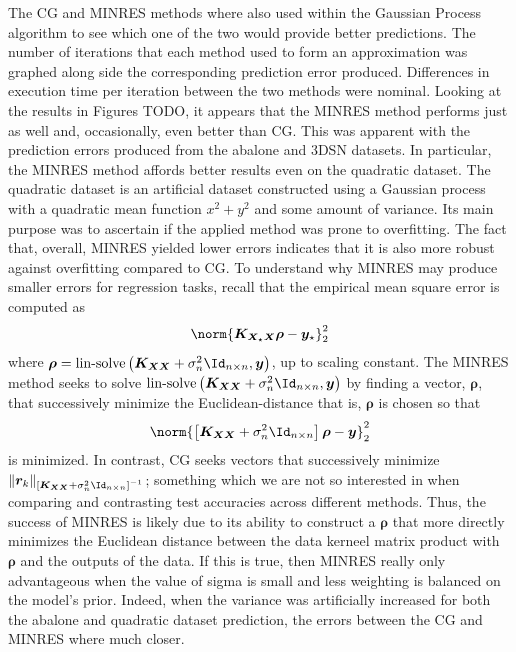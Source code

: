 The CG and MINRES methods where also used within the Gaussian Process algorithm to see which one of the two would provide better predictions. The number of iterations that each method used to form an approximation was graphed along side the corresponding prediction error produced. Differences in execution time per iteration between the two methods were nominal. Looking at the results in Figures TODO, it appears that the MINRES method performs just as well and, occasionally, even better than CG. This was apparent with the prediction errors produced from the abalone and 3DSN datasets. In particular, the MINRES method affords better results even on the quadratic dataset. The quadratic dataset is an artificial dataset constructed using a Gaussian process with a quadratic mean function $x^2 + y^2$ and some amount of variance. Its main purpose was to ascertain if the applied method was prone to overfitting. The fact that, overall, MINRES yielded lower errors indicates that it is also more robust against overfitting compared to CG. To understand why MINRES may produce smaller errors for regression tasks, recall that the empirical mean square error is computed as
\begin{align*}
    \norm{\bm{K_{X_{\star} X}} \bm{\rho} - \bm{y}_{\star}}_2^2
\end{align*}
where $\bm{\rho} = \operatorname{lin-solve} \left( \bm{K_{XX}} + \sigma_n^2 \Id_{n \times n} , \bm{y} \right)$, up to scaling constant. The MINRES method seeks to solve $\operatorname{lin-solve} \left( \bm{K_{XX}} + \sigma_n^2 \Id_{n \times n} , \bm{y} \right)$ by finding a vector, $\bm{\rho}$, that successively minimize the Euclidean-distance that is, $\bm{\rho}$ is chosen so that
\begin{equation*}
    \norm{\left[ \bm{K_{XX}} + \sigma_n^2 \Id_{n \times n} \right] \bm{\rho} - \bm{y}}_2^2
\end{equation*}
is minimized. In contrast, CG seeks vectors that successively minimize $\| \bm{r}_{k} \|_{\left[ \bm{K_{XX}} + \sigma_n^2 \Id_{n \times n} \right]^{-1}}$; something which we are not so interested in when comparing and contrasting test accuracies across different methods. Thus, the success of MINRES is likely due to its ability to construct a $\bm{\rho}$ that more directly minimizes the Euclidean distance between the data kerneel matrix product with $\bm{\rho}$ and the outputs of the data. If this is true, then MINRES really only advantageous when the value of sigma is small and less weighting is balanced on the model's prior. Indeed, when the variance was artificially increased for both the abalone and quadratic dataset prediction, the errors between the CG and MINRES where much closer.